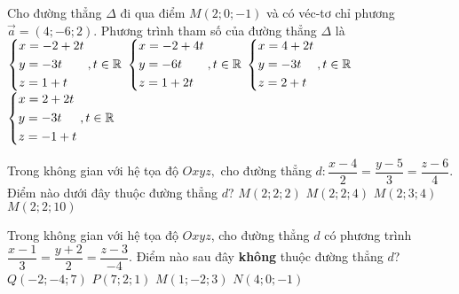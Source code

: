 \begin{ex}%
	Cho đường thẳng $\Delta $ đi qua điểm $M\left(2;0;-1\right)$ và có véc-tơ chỉ phương $\vec{a}=(4;-6;2)$. Phương trình tham số của đường thẳng $\Delta $ là
	\choice
	{$\left\{\begin{aligned}
			& x=-2+2t \\ 
			& y=-3t \\ 
			& z=1+t \\\end{aligned}\right., t \in \mathbb{R}$}
	{$\left\{\begin{aligned}
			& x=-2+4t \\ 
			& y=-6t \\ 
			& z=1+2t \\\end{aligned}\right., t \in \mathbb{R}$}
	{$\left\{\begin{aligned}
			& x=4+2t \\ 
			& y=-3t \\ 
			& z=2+t \\\end{aligned}\right., t \in \mathbb{R}$}
	{\True $\left\{\begin{aligned}
			& x=2+2t \\ 
			& y=-3t \\ 
			& z=-1+t \\\end{aligned}\right., t \in \mathbb{R}$}
\end{ex}
\begin{ex}%
	Trong không gian với hệ tọa độ $Oxyz,$ cho đường thẳng $d:\dfrac{x-4}{2}=\dfrac{y-5}{3}=\dfrac{z-6}{4}.$ Điểm nào dưới đây thuộc đường thẳng $d$?
	\choice
	{\True $M\left(2;2;2\right)$}
	{$M\left(2;2;4\right)$}
	{$M\left(2;3;4\right)$}
	{$M\left(2;2;10\right)$}
\end{ex}
\begin{ex}%
	Trong không gian với hệ tọa độ $Oxyz$, cho đường thẳng $d$ có phương trình $\dfrac{x-1}{3}=\dfrac{y+2}{2}=\dfrac{z-3}{-4}$. Điểm nào sau đây \textbf{không} thuộc đường thẳng $d$?
	\choice
	{$Q\left(-2;-4;7\right)$}
	{\True $P\left(7;2;1\right)$}
	{$M\left(1;-2;3\right)$}
	{$N\left(4;0;-1\right)$}
\end{ex}
